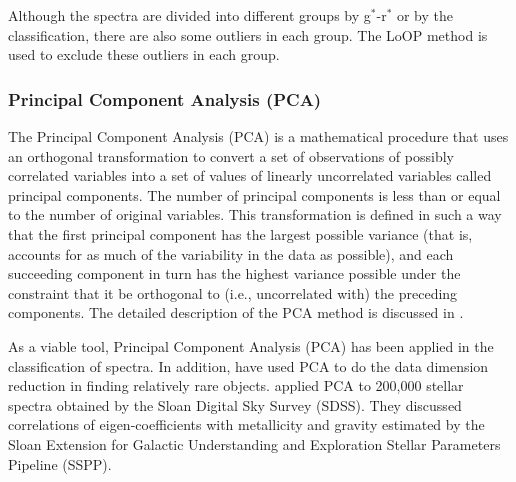 \documentclass[referee]{raa}            %
\begin{document}
Although the spectra are divided into different groups by g$^*$-r$^*$ or by the classification, there are also some outliers in each group.
The LoOP method is used to exclude these outliers in each group.

\subsubsection{Principal Component Analysis (PCA)}
The Principal Component Analysis  (PCA) \citep{jolliffe2002principal} is a mathematical procedure that uses an orthogonal transformation to convert a set of observations of possibly correlated variables into a set of values of linearly uncorrelated variables called principal components.
			     	  	The number of principal components is less than or equal to the number of original variables.
			     	  	This transformation is defined in such a way that the first principal component has the largest possible variance  (that is,  accounts for as much of the variability in the data as possible),
			     	  	and each succeeding component in turn has the highest variance possible under the constraint that it be orthogonal to   (i.e.,  uncorrelated with) the preceding components.	
				      The detailed description of the PCA method is discussed in \citet{whitney1983principal,jolliffe2002principal}.
				
				      As a viable tool, Principal Component Analysis (PCA) has been applied  in the classification of spectra\citep{whitney1983principal,bailer1998automated,yip2004spectral,almeida2013automated}.
In addition, \cite{tu2009new,tu2010method,jiang2013data,wei2013mining} have used PCA to do the data dimension reduction in finding relatively rare objects.
\cite{mcgurk2010principal} applied PCA to 200,000 stellar spectra obtained by the Sloan Digital Sky Survey  (SDSS).
They discussed correlations of eigen-coefficients with metallicity and gravity estimated by the Sloan Extension for Galactic Understanding and Exploration Stellar Parameters Pipeline (SSPP)\citep{lee2008segue}.
\end{document}
